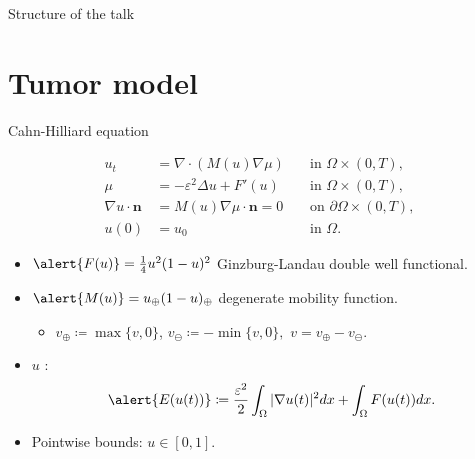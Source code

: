 
\begin{frame}[t,plain]
\titlepage
\end{frame}

\begin{frame}{Structure of the talk}
	\tableofcontents
\end{frame}

\section{Tumor model}

\begin{frame}{Cahn-Hilliard equation}
	\begin{block}{}
		\vspace*{-0.2cm}
		\begin{equation*}
			\begin{aligned}
				u_t&= \nabla\cdot \left(M(u)\nabla\mu\right)\quad&\text{in }\Omega\times(0,T),\\
				\mu&=-\varepsilon^2\Delta u+F'(u)\quad&\text{in }\Omega\times(0,T),\\
				\nabla u\cdot \mathbf{n}&=M(u)\nabla\mu\cdot\mathbf{n}=0\quad&\text{on }\partial\Omega\times(0,T),\\
				u(0)&=u_0\quad&\text{in }\Omega.
			\end{aligned}
		\end{equation*}
	\end{block}
	\begin{itemize}
		\item $\alert{F(u)}=\frac{1}{4}u^2(1-u)^2$ Ginzburg-Landau double well functional.
		\item $\alert{M(u)}=u_\oplus(1-u)_\oplus$ degenerate mobility function.
		\begin{itemize}
			\item $v_\oplus \coloneqq\max\{v,0\}$,\quad
			$v_\ominus \coloneqq-\min\{v,0\},$\quad
			$v=v_\oplus  - v_\ominus$.
		\end{itemize}
		\item $u$ :
		$$\alert{E(u(t))}\coloneqq\frac{\varepsilon^2}{2}\int_\Omega|\nabla u(t)|^2dx+\int_\Omega F(u(t))dx.$$
		\item Pointwise bounds: $u\in[0,1]$. 
	\end{itemize}
\end{frame}

